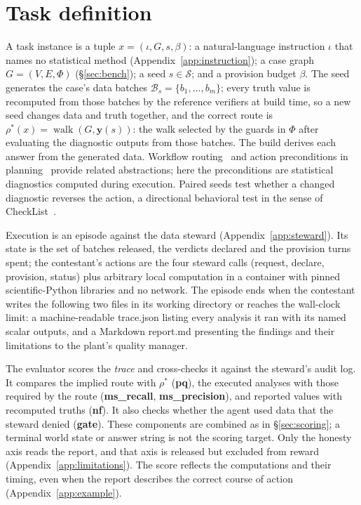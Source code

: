 \documentclass{article}
\begin{document}
\section{Task definition}
\label{app:taskdef}

A task instance is a tuple $x = (\iota, G, s, \beta)$: a natural-language instruction
$\iota$ that names no statistical method (Appendix~\ref{app:instruction}); a case graph
$G = (V, E, \Phi)$ (\S\ref{sec:bench}); a seed $s \in \mathcal{S}$; and a
provision budget $\beta$. The seed generates the case's data batches
$\mathcal{B}_s = \{b_1, \dots, b_m\}$; every
truth value is recomputed from those batches by the reference verifiers at build time, so a
new seed changes data and truth together, and the correct route is
$\rho^*(x) = \operatorname{walk}(G, \mathbf{y}(s))$: the walk selected by the guards in $\Phi$ after evaluating the diagnostic outputs from those batches. The build derives each answer from the generated data. Workflow routing~\citep{vanderaalst2003workflow} and action
preconditions in planning~\citep{valmeekam2023planbench} provide related abstractions;
here the preconditions are statistical diagnostics computed during execution. Paired
seeds test whether a changed diagnostic reverses the action, a directional behavioral
test in the sense of CheckList~\citep{ribeiro2020checklist}.

Execution is an episode against the data steward (Appendix~\ref{app:steward}). Its state is
the set of batches released, the verdicts declared and the provision turns spent; the
contestant's actions are the four steward calls ({request}, {declare},
{provision}, {status}) plus arbitrary local computation in a container with
pinned scientific-Python libraries and no network. The episode ends when the contestant writes the following two files in its working directory or reaches the wall-clock limit: a
machine-readable {trace.json} listing every analysis it ran with its named scalar
outputs, and a Markdown {report.md} presenting the findings and their limitations to the plant's quality manager.

The evaluator scores the \emph{trace} and cross-checks it against the steward's audit log. It compares the implied route with $\rho^*$ (\textbf{pq}), the executed analyses with those required by the route (\textbf{ms\_recall}, \textbf{ms\_precision}), and reported values with recomputed truths (\textbf{nf}). It also checks whether the agent used data that the steward denied (\textbf{gate}). These components are combined as in \S\ref{sec:scoring}; a terminal world state or answer string is not the scoring target. Only the honesty axis reads the report, and that axis is released but excluded from reward (Appendix~\ref{app:limitations}). The score reflects the computations and their timing, even when the report describes the correct course of action (Appendix~\ref{app:example}).
\end{document}
